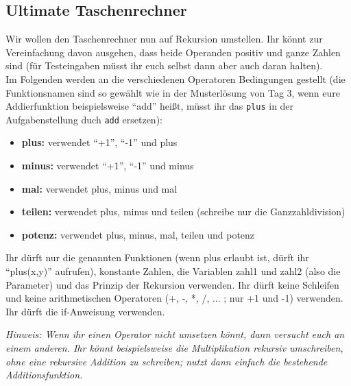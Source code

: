 \subsection{Ultimate Taschenrechner }
Wir wollen den Taschenrechner nun auf Rekursion umstellen. Ihr könnt zur Vereinfachung
davon ausgehen, dass beide Operanden positiv und ganze Zahlen sind (für Testeingaben
müsst ihr euch selbst dann aber auch daran halten).\\
Im Folgenden werden an die verschiedenen Operatoren Bedingungen gestellt (die
Funktionsnamen sind so gewählt wie in der Musterlösung von Tag 3, wenn eure
Addierfunktion beispielsweise "`add"' heißt, müsst ihr das \texttt{plus} in der Aufgabenstellung duch \texttt{add} ersetzen):
\begin{itemize}
    \item \textbf{\textcolor[rgb]{0,0.5,1}{plus:}} verwendet "`+1"', "`-1"' und plus
    \item \textbf{\textcolor[rgb]{0,0.5,1}{minus:}} verwendet "`+1"', "`-1"' und minus
    \item \textbf{\textcolor[rgb]{0,0.5,1}{mal:}} verwendet plus, minus und mal
    \item \textbf{\textcolor[rgb]{0,0.5,1}{teilen:}} verwendet plus, minus und teilen (schreibe nur die Ganzzahldivision)
    \item \textbf{\textcolor[rgb]{0,0.5,1}{potenz:}} verwendet plus, minus, mal, teilen und potenz
\end{itemize}
Ihr dürft nur die genannten Funktionen (wenn plus erlaubt ist, dürft ihr "`plus(x,y)"' aufrufen),
konstante Zahlen, die Variablen zahl1 und zahl2 (also die Parameter) und das Prinzip
der Rekursion verwenden. Ihr dürft keine Schleifen und keine arithmetischen Operatoren
(+, -, *, /, ... ; nur +1 und -1) verwenden. Ihr dürft die if-Anweisung verwenden.

\textit{Hinweis: Wenn ihr einen Operator nicht umsetzen könnt, dann versucht euch an einem anderen.
Ihr könnt beispielsweise die Multiplikation rekursiv umschreiben, ohne eine rekursive
Addition zu schreiben; nutzt dann einfach die bestehende Additionsfunktion.}
